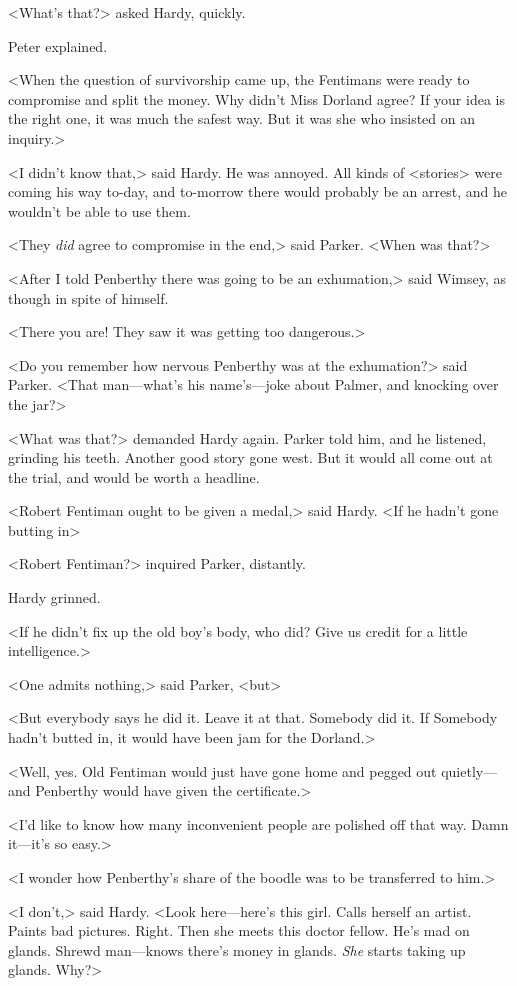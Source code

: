 <What's that?> asked Hardy, quickly.

Peter explained.

<When the question of survivorship came up, the Fentimans were ready to compromise and split the money. Why didn't Miss Dorland agree? If your idea is the right one, it was much the safest way. But it was she who insisted on an inquiry.>

<I didn't know that,> said Hardy. He was annoyed. All kinds of <stories> were coming his way to-day, and to-morrow there would probably be an arrest, and he wouldn't be able to use them.

<They \emph{did} agree to compromise in the end,> said Parker. <When was that?>

<After I told Penberthy there was going to be an exhumation,> said Wimsey, as though in spite of himself.

<There you are! They saw it was getting too dangerous.>

<Do you remember how nervous Penberthy was at the exhumation?> said Parker. <That man—what's his name's—joke about Palmer, and knocking over the jar?>

<What was that?> demanded Hardy again. Parker told him, and he listened, grinding his teeth. Another good story gone west. But it would all come out at the trial, and would be worth a headline.

<Robert Fentiman ought to be given a medal,> said Hardy. <If he hadn't gone butting in\longdash>

<Robert Fentiman?> inquired Parker, distantly.

Hardy grinned.

<If he didn't fix up the old boy's body, who did? Give us credit for a little intelligence.>

<One admits nothing,> said Parker, <but\longdash>

<But everybody says he did it. Leave it at that. Somebody did it. If Somebody hadn't butted in, it would have been jam for the Dorland.>

<Well, yes. Old Fentiman would just have gone home and pegged out quietly—and Penberthy would have given the certificate.>

<I'd like to know how many inconvenient people are polished off that way. Damn it—it's so easy.>

<I wonder how Penberthy's share of the boodle was to be transferred to him.>

<I don't,> said Hardy. <Look here—here's this girl. Calls herself an artist. Paints bad pictures. Right. Then she meets this doctor fellow. He's mad on glands. Shrewd man—knows there's money in glands. \emph{She} starts taking up glands. Why?>

